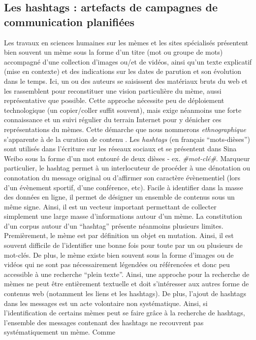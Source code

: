 \subsection[Les hashtags ne sont pas des mèmes]{Les hashtags : artefacts de campagnes de communication planifiées}
\label{sec:hashtags}

Les travaux en sciences humaines sur les mèmes \citep{Bauckhage2011, Coscia2013, Knobel2007} et les sites spécialisés \citep{Buchel2012, Bernstein2011} présentent bien souvent un mème sous la forme d{\textquoteright}un titre (mot ou groupe de mots) accompagné d{\textquoteright}une collection d{\textquoteright}images ou/et de vidéos, ainsi qu{\textquoteright}un texte explicatif (mise en contexte) et des indications sur les dates de parution et son évolution dans le temps. Ici, un ou des auteurs se saisissent des matériaux bruts du web et les rassemblent pour reconstituer une vision particulière du mème, aussi représentative que possible. Cette approche nécessite peu de déploiement technologique (un copier/coller suffit souvent), mais exige néanmoins une forte connaissance et un suivi régulier du terrain Internet pour y dénicher ces représentations du mèmes. Cette démarche que nous nommerons \textit{ethnographique }s{\textquoteright}apparente à de la curation de contenu \citep{Buckingham2006}. Les \textit{hashtags }(en fran\c{c}ais {\textquotedblleft}mots-dièses{\textquotedblright}) sont utilisés dans l{\textquoteright}écriture sur les réseaux sociaux et se présentent dans Sina Weibo sous la forme d{\textquoteright}un mot entouré de deux dièses - ex. \textit{\#mot-clé\#}. Marqueur particulier, le hashtag permet à un interlocuteur de procéder à une dénotation ou connotation du message original \citep{Romero2011} ou d{\textquoteright}affirmer son caractère évènementiel (lors d{\textquoteright}un évènement sportif, d{\textquoteright}une conférence, etc). Facile à identifier dans la masse des données en ligne, il permet de désigner un ensemble de contenus sous un m\^eme signe. Ainsi, il est un vecteur important permettant de collecter simplement une large masse d{\textquoteright}informations autour d{\textquoteright}un mème. La constitution d{\textquoteright}un corpus autour d{\textquoteright}un {\textquotedblleft}hashtag{\textquotedblright} présente néanmoins plusieurs limites. Premièrement, le mème est par définition un objet en mutation. Ainsi, il est souvent difficile de l{\textquoteright}identifier une bonne fois pour toute par un ou plusieurs de mot-clés. De plus, le mème existe bien souvent sous la forme d{\textquoteright}images ou de vidéos qui ne sont pas nécessairement légendées ou référencées et donc peu accessible à une recherche {\textquotedblleft}plein texte{\textquotedblright}. Ainsi, une approche pour la recherche de mèmes ne peut \^etre entièrement textuelle et doit s{\textquoteright}intéresser aux autres forme de contenus web (notamment les liens et les hashtags). De plus, l{\textquoteright}ajout de hashtags dans les messages est un acte volontaire non systématique. Ainsi, si l{\textquoteright}identification de certains mèmes peut se faire gr\^ace à la recherche de hashtags, l{\textquoteright}ensemble des messages contenant des hashtags ne recouvrent pas systématiquement un mème. Comme 